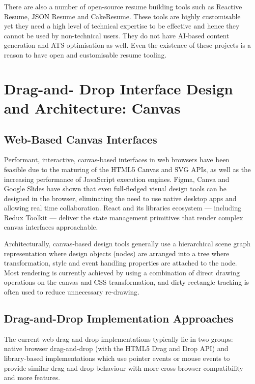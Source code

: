 \documentclass[12pt, a4paper, oneside]{report}
\begin{document}
There are also a number of open-source resume building tools such as Reactive Resume, JSON Resume and CakeResume. These tools are highly customisable yet they need a high level of technical expertise to be effective and hence they cannot be used by non-technical users. They do not have AI-based content generation and ATS optimisation as well.  Even the existence of these projects is a reason to have open and customisable resume tooling.
\section{Drag-and- Drop Interface Design and Architecture: Canvas}

\subsection{Web-Based Canvas Interfaces}

Performant, interactive, canvas-based interfaces in web browsers have been feasible due to the maturing of the HTML5 Canvas and SVG APIs, as well as the increasing performance of JavaScript execution engines. Figma, Canva and Google Slides have shown that even full-fledged visual design tools can be designed in the browser, eliminating the need to use native desktop apps and allowing real time collaboration. React and its libraries ecosystem --- including Redux Toolkit \cite{reduxtoolkit2024} --- deliver the state management primitives that render complex canvas interfaces approachable.

Architecturally, canvas-based design tools generally use a hierarchical scene graph representation where design objects (nodes) are arranged into a tree where transformation, style and event handling properties are attached to the node. Most rendering is currently achieved by using a combination of direct drawing operations on the canvas and CSS transformation, and dirty rectangle tracking is often used to reduce unnecessary re-drawing.

\subsection{Drag-and-Drop Implementation Approaches}

The current web drag-and-drop implementations typically lie in two groups: native browser drag-and-drop (with the HTML5 Drag and Drop API) and library-based implementations which use pointer events or mouse events to provide similar drag-and-drop behaviour with more cross-browser compatibility and more features.
\end{document}
